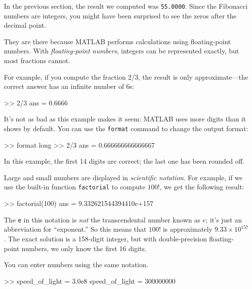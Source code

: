 \documentclass[../../book.tex]{subfiles}
\begin{document}
In the previous section, the result we computed was \lstinline{55.0000}.  Since the Fibonacci numbers are integers, you might have been surprised to see the zeros after the decimal point.

They are there because MATLAB performs calculations using floating-point numbers.  With \emph{floating-point numbers}, integers can be represented exactly, but most fractions cannot.


For example, if you compute the fraction 2/3, the result is only approximate---the correct answer has an infinite number of 6s:

\begin{code}
>> 2/3
ans = 0.6666
\end{code}



It's not as bad as this example makes it seem: MATLAB uses more digits than it shows by default.
You can use the \lstinline{format} command to change the output format:


\begin{code}
>> format long
>> 2/3
ans = 0.666666666666667
\end{code}

In this example, the first 14 digits are correct; the last one has been rounded off.


Large and small numbers are displayed in \emph{scientific notation}.
For example, if we use the built-in function \lstinline{factorial} to compute $100!$, we get the following result:

\begin{code}
>> factorial(100)
ans = 9.332621544394410e+157
\end{code}

The \lstinline{e} in this notation is \emph{not} the transcendental number
known as $e$; it's just an abbreviation for ``exponent.''  So
this means that $100!$ is approximately $9.33 \times 10^{157}$.  The
exact solution is a 158-digit integer, but with double-precision floating-point numbers, we only know the first 16 digits.


You can enter numbers using the same notation.

\begin{code}
>> speed_of_light = 3.0e8
speed_of_light = 300000000
\end{code}
\end{document}
